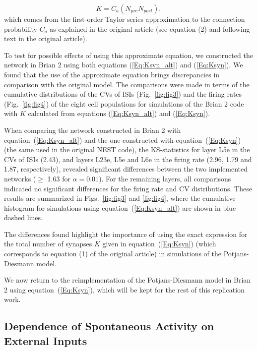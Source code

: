 \documentclass[10pt,a4paper,onecolumn]{article}
\begin{document}
\begin{equation}
  \label{Eq:Ksyn_alt}
  K = C_a(N_{pre}N_{post}),
\end{equation}
\noindent which comes from the first-order Taylor series approximation to the connection probability $C_{a}$ as explained in the original article (see equation (2) and following text in the original article). 

To test for possible effects of using this approximate equation, we constructed the network in Brian 2 using both equations (\ref{Eq:Ksyn_alt}) and (\ref{Eq:Ksyn}). We found that the use of the approximate equation brings discrepancies in comparison with the original model. The comparisons were made in terms of the cumulative distributions of the CVs of ISIs (Fig.~\ref{fig:fig3}) and the firing rates (Fig.~\ref{fig:fig4}) of the eight cell populations for simulations of the Brian 2 code with $K$ calculated from equations (\ref{Eq:Ksyn_alt}) and (\ref{Eq:Ksyn}). 

When comparing the network constructed in Brian 2 with equation~(\ref{Eq:Ksyn_alt}) and the one constructed with equation~(\ref{Eq:Ksyn}) (the same used in the original NEST code), the  KS-statistics for layer L5e in the CVs of ISIs (2.43), and layers L23e, L5e and L6e in the firing rate (2.96, 1.79 and 1.87, respectively), revealed significant differences between the two implemented networks ($\geq$ 1.63 for $\alpha=0.01$). For the remaining layers, all comparisons indicated no significant differences for the firing rate and CV distributions. These results are summarized in Figs.~\ref{fig:fig3} and \ref{fig:fig4}, where the cumulative histogram for simulations using equation~(\ref{Eq:Ksyn_alt}) are shown in blue dashed lines.

The differences found highlight the importance of using the exact expression for the total number of synapses $K$ given in equation~(\ref{Eq:Ksyn}) (which corresponds to equation (1) of the original article)  in simulations of the Potjans-Diesmann model. 

We now return to the reimplementation of the Potjans-Diesmann model in Brian 2 using equation~(\ref{Eq:Ksyn}), which will be kept for the rest of this replication work. 
 
\subsection{Dependence of Spontaneous Activity on External Inputs}
\end{document}
